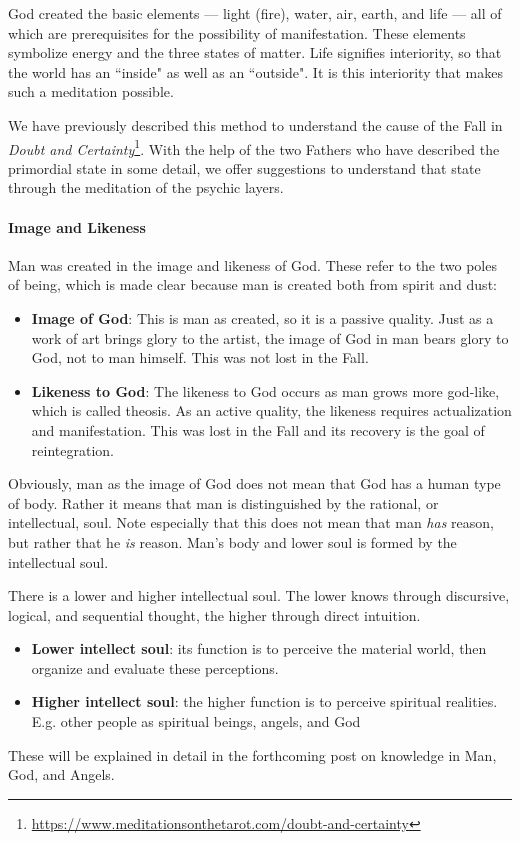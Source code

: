 God created the basic elements — light (fire), water, air, earth, and life — all of which are prerequisites for the possibility of manifestation. These elements symbolize energy and the three states of matter. Life signifies interiority, so that the world has an ``inside" as well as an ``outside". It is this interiority that makes such a meditation possible.

We have previously described this method to understand the cause of the Fall in \textit{Doubt and Certainty}\footnote{\url{https://www.meditationsonthetarot.com/doubt-and-certainty}}. With the help of the two Fathers who have described the primordial state in some detail, we offer suggestions to understand that state through the meditation of the psychic layers.

\paragraph{Image and Likeness}
Man was created in the image and likeness of God. These refer to the two poles of being, which is made clear because man is created both from spirit and dust:

\begin{itemize}
\item \textbf{Image of God}: This is man as created, so it is a passive quality. Just as a work of art brings glory to the artist, the image of God in man bears glory to God, not to man himself. This was not lost in the Fall. 
\item \textbf{Likeness to God}: The likeness to God occurs as man grows more god-like, which is called theosis. As an active quality, the likeness requires actualization and manifestation. This was lost in the Fall and its recovery is the goal of reintegration. 
\end{itemize}
Obviously, man as the image of God does not mean that God has a human type of body. Rather it means that man is distinguished by the rational, or intellectual, soul. Note especially that this does not mean that man \emph{has} reason, but rather that he \emph{is} reason. Man's body and lower soul is formed by the intellectual soul.

There is a lower and higher intellectual soul. The lower knows through discursive, logical, and sequential thought, the higher through direct intuition.

\begin{itemize}
\item \textbf{Lower intellect soul}: its function is to perceive the material world, then organize and evaluate these perceptions. 
\item \textbf{Higher intellect soul}: the higher function is to perceive spiritual realities. E.g. other people as spiritual beings, angels, and God 
\end{itemize}
These will be explained in detail in the forthcoming post on knowledge in Man, God, and Angels.


